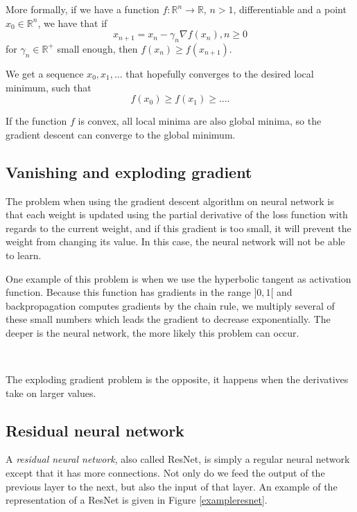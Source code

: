 \documentclass[10pt,a4paper]{article}
\theoremstyle{definition}
\theoremstyle{definition}
\theoremstyle{definition}
\begin{document}
More formally, if we have a function $f: \mathbb{R}^n \rightarrow \mathbb{R}$, $n>1$, differentiable and a point $x_0\in \mathbb{R}^n$, we have that if
$$
x_{n+1} = x_n -\gamma_n \nabla f(x_n), n\geq 0
$$
for $\gamma_n \in \mathbb{R}^+$ small enough, then $f(x_n) \geq f(x_{n+1})$. 

We get a sequence $x_0,x_1,\dots$ that hopefully converges to the desired local minimum, such that
$$
f(x_0) \geq f(x_1) \geq \dots . 
$$

If the function $f$ is convex, all local minima are also global minima, so the gradient descent can converge to the global minimum.

\subsection{Vanishing and exploding gradient}

The problem when using the gradient descent algorithm on neural network is that each weight is updated using the partial derivative of the loss function with regards to the current weight, and if this gradient is too small, it will prevent the weight from changing its value. In this case, the neural network will not be able to learn.

One example of this problem is when we use the hyperbolic tangent as activation function. Because this function has gradients in the range $]0,1[$ and backpropagation computes gradients by the chain rule, we multiply several of these small numbers which leads the gradient to decrease exponentially. The deeper is the neural network, the more likely this problem can occur.

~

The exploding gradient problem is the opposite, it happens when the derivatives take on larger values.


\subsection{Residual neural network} \label{rnn}

A\textit{ residual neural network}, also called ResNet, is simply a regular neural network except that it has more connections. Not only do we feed the output of the previous layer to the next, but also the input of that layer. 
An example of the representation of a ResNet is given in Figure \ref{exampleresnet}.
\end{document}
